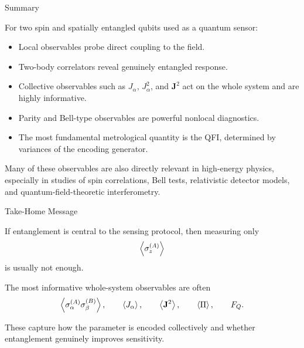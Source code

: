 \documentclass{beamer}
\begin{document}
\begin{frame}{Summary}

For two spin and spatially entangled qubits used as a quantum sensor:

\begin{itemize}
    \item Local observables probe direct coupling to the field.
    \item Two-body correlators reveal genuinely entangled response.
    \item Collective observables such as $J_\alpha$, $J_\alpha^2$, and $\mathbf{J}^2$
    act on the whole system and are highly informative.
    \item Parity and Bell-type observables are powerful nonlocal diagnostics.
    \item The most fundamental metrological quantity is the QFI,
    determined by variances of the encoding generator.
\end{itemize}

Many of these observables are also directly relevant in high-energy physics,
especially in studies of spin correlations, Bell tests, relativistic detector models,
and quantum-field-theoretic interferometry.

\end{frame}

\begin{frame}{Take-Home Message}

If entanglement is central to the sensing protocol, then measuring only
\[
\expval{\sigma_z^{(A)}}
\]
is usually not enough.

The most informative whole-system observables are often
\[
\expval{\sigma_\alpha^{(A)}\sigma_\beta^{(B)}},\qquad
\expval{J_\alpha},\qquad
\expval{\mathbf{J}^2},\qquad
\expval{\Pi},\qquad
F_Q.
\]

These capture how the parameter is encoded collectively and whether
entanglement genuinely improves sensitivity.

\end{frame}
\end{document}
